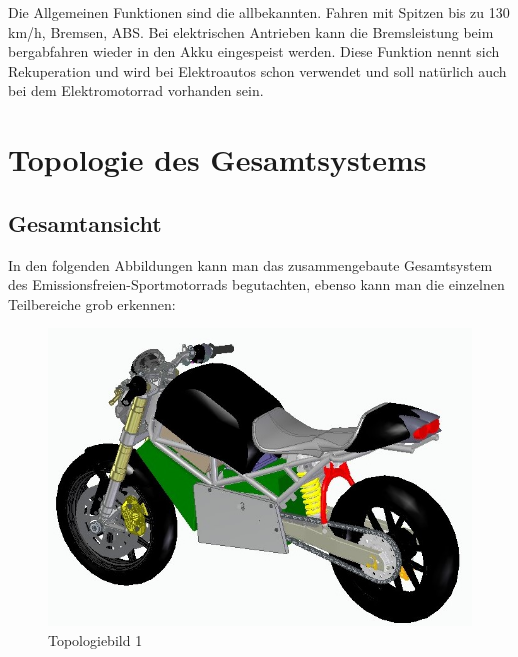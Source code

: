Die Allgemeinen Funktionen sind die allbekannten. Fahren mit Spitzen bis zu 130 km/h, Bremsen, ABS. Bei elektrischen Antrieben kann die Bremsleistung beim bergabfahren wieder in den Akku eingespeist werden. Diese Funktion nennt sich Rekuperation und wird bei Elektroautos schon verwendet und soll natürlich auch bei dem Elektromotorrad vorhanden sein.
\newpage

\section{Topologie des Gesamtsystems}
\subsection{Gesamtansicht}
In den folgenden Abbildungen kann man das zusammengebaute Gesamtsystem des Emissionsfreien-Sportmotorrads begutachten, ebenso kann man die einzelnen Teilbereiche grob erkennen:
\begin{figure} [H]
	\begin{center}
		\includegraphics[scale=0.9] {figures/mechanik/Ducati1.jpg}
		\caption{Topologiebild 1}
		\label{fig:Topologiebild 1}
	\end{center}
\end{figure}

